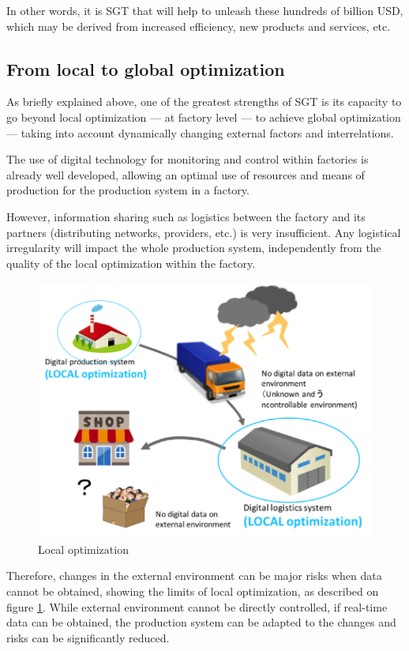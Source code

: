 In other words, it is SGT that will help to unleash these hundreds of billion USD, which may be derived from increased efficiency, new products and services, etc.

\subsection{From local to global optimization} \label{optimization}

As briefly explained above, one of the greatest strengths of SGT is its capacity to go beyond local optimization --- at factory level --- to achieve global optimization --- taking into account dynamically changing external factors and interrelations.

\vspace{0.4 cm}

The use of digital technology for monitoring and control within factories is already well developed, allowing an optimal use of resources and means of production for the production system in a factory.

However, information sharing such as logistics between the factory and its partners (distributing networks, providers, etc.) is very insufficient. Any logistical irregularity will impact the whole production system, independently from the quality of the local optimization within the factory.

\begin{figure}[H]
\begin{center}
\includegraphics[width = 0.7\linewidth]{Figures/local_optimization.png}
\end{center}
\caption{Local optimization}
\label{local_optimization}
\end{figure}

Therefore, changes in the external environment can be major risks when data cannot be obtained, showing the limits of local optimization, as described on figure \ref{local_optimization}. While external environment cannot be directly controlled, if real-time data can be obtained, the production system can be adapted to the changes and risks can be significantly reduced.

